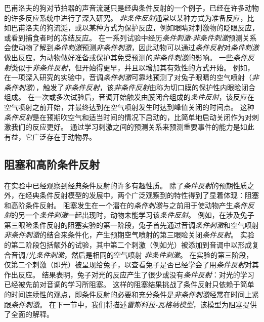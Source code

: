 巴甫洛夫的狗对节拍器的声音流涎只是经典条件反射的一个例子，已经在许多动物的许多反应系统中进行了深入研究。
\textit{非条件反射}通常以某种方式为准备反应，比如巴甫洛夫的狗流涎，或以某种方式为保护反应，例如眼睛对刺激物的眨眼反应，或看到捕食者时的冻结反应。
在一系列试验中经历\textit{条件刺激}-\textit{非条件刺激}预测关系会使动物了解到\textit{条件刺激}预测\textit{非条件刺激}，因此动物可以通过\textit{条件反射}对\textit{条件刺激}做出反应，为动物做好准备或保护其免受预测的\textit{非条件刺激}的影响。
一些\textit{条件反射}类似于\textit{非条件反射}，但开始得更早，并且以增加其有效性的方式开始。
例如，在一项深入研究的实验中，音调\textit{条件刺激}可靠地预测了对兔子眼睛的空气喷射（\textit{非条件刺激}），触发了\textit{非条件反射}，该\textit{非条件反射}由称为切口膜的保护性内眼睑闭合组成。
在一次或多次试验后，音调开始触发由膜闭合组成的\textit{条件反射}，该反应在空气喷射之前开始，并最终达到在空气喷射发生时达到峰值关闭的时间点。
这种\textit{条件反射}是在预期吹空气和适当时间的情况下启动的，比简单地启动关闭作为对刺激我们的反应更好。
通过学习刺激之间的预测关系来预测重要事件的能力是如此有益，它广泛存在于动物界。



\subsection{阻塞和高阶条件反射} \label{sec:blocking_higher_order}

在实验中已经观察到经典条件反射的许多有趣性质。
除了\textit{条件反射}的预期性质之外，在经典条件反射模型的发展中，两个广泛观察到的特性得到了显着体现：阻塞和高阶条件反射。
阻塞发生在一个潜在的\textit{条件刺激}与之前用于使动物产生\textit{条件反射}的另一个\textit{条件刺激}一起出现时，动物未能学习该\textit{条件反射}。
例如，在涉及兔子第三眼睑条件反射的阻塞实验的第一阶段，兔子首先通过音调\textit{条件刺激}和空气喷射 \textit{非条件刺激}的结合来条件化，产生预期空气喷射的第三眼睑关闭\textit{条件反射}。
实验的第二阶段包括额外的试验，其中第二个刺激（例如光）被添加到音调中以形成复合音调/光\textit{条件刺激}，然后是相同的空气喷射 \textit{非条件刺激}。
在实验的第三阶段，仅第二个刺激（即光）被呈现给兔子，以查看兔子是否已经学会了用\textit{条件反射}对其作出反应。
结果表明，兔子对光的反应产生了很少或没有\textit{条件反射}：对光的学习已经被先前对音调的学习所阻塞。
这样的阻塞结果挑战了条件反射只依赖于简单的时间连续性的观点，即条件反射的必要和充分条件是\textit{非条件刺激}经常在时间上紧跟\textit{条件刺激}。
在下一节中，我们将描述\textit{雷斯科拉-瓦格纳模型}\cite{rescorla1972theory}，该模型为阻塞提供了全面的解释。



